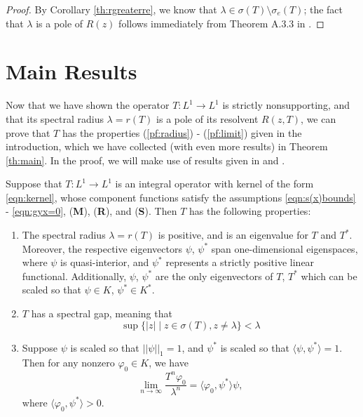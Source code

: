 \begin{proof}
	By Corollary \ref{th:rgreaterre}, we know that $\lambda \in \sigma(T) \setminus \sigma_e(T)$; the fact that $\lambda$ is a pole of $R(z)$ follows immediately from Theorem A.3.3 in \cite{Clement1987}. 
\end{proof}

\section{Main Results} \label{section:mainresults}

Now that we have shown the operator $T:L^1 \to L^1$ is strictly nonsupporting, and that its spectral radius $\lambda = r(T)$ is a pole of its resolvent $R(z, T)$, we can prove that $T$ has the properties (\ref{pf:radius}) - (\ref{pf:limit}) given in the introduction, which we have collected (with even more results) in Theorem \ref{th:main}. In the proof, we will make use of results given in \cite{Marek1970} and \cite{Sawashima1964}.

\begin{theorem} \label{th:main}
	Suppose that $T:L^1 \to L^1$ is an integral operator with kernel of the form \eqref{eqn:kernel}, whose component functions satisfy the assumptions \eqref{eqn:s(x)bounds} - \eqref{eqn:gyx=0}, 
	(\textbf{M}), (\textbf{R}), and (\textbf{S}). Then $T$ has the following properties:
	\begin{enumerate}
		\item The spectral radius $\lambda = r(T)$ is positive, and is an eigenvalue for $T$ and $T^*$. Moreover, the respective eigenvectors $\psi$, $\psi^*$ span one-dimensional eigenspaces, where $\psi$ is quasi-interior, and $\psi^*$ represents a strictly positive linear functional. Additionally, $\psi$, $\psi^*$ are the only eigenvectors of $T$, $T^*$ which can be scaled so that $\psi \in K$, $\psi^* \in K^*$.
		\item $T$ has a spectral gap, meaning that
		\[\sup\{ |z| \mid z \in \sigma(T), z \neq \lambda\} < \lambda\]
		\item Suppose $\psi$ is scaled so that $||\psi||_1 = 1$, and $\psi^*$ is scaled so that $\langle \psi, \psi^* \rangle = 1$. Then for any nonzero $\varphi_0 \in K$, we have
		\[\lim_{n \to \infty} \frac{T^n \varphi_0}{\lambda^n} = \langle \varphi_0, \psi^* \rangle \psi,\]
		where $\langle \varphi_0, \psi^* \rangle > 0$.
	\end{enumerate}
\end{theorem}

